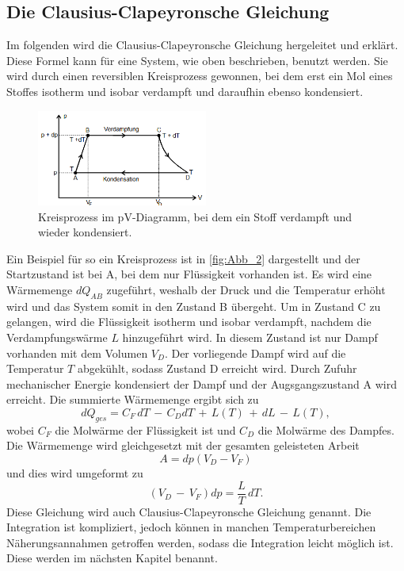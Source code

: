 \subsection{Die Clausius-Clapeyronsche Gleichung} %
\label{sub:CC-Gl}
Im folgenden wird die Clausius-Clapeyronsche Gleichung hergeleitet und erklärt. 
Diese Formel kann für eine System, wie oben beschrieben, benutzt werden.
Sie wird durch einen reversiblen Kreisprozess gewonnen, bei dem erst ein Mol eines Stoffes isotherm und isobar verdampft und daraufhin ebenso kondensiert.
\begin{figure}[H]
    \centering
    \includegraphics[width=0.5\textwidth]{build/Abb_2.PNG}
    \caption {Kreisprozess im pV-Diagramm, bei dem ein Stoff verdampft und wieder kondensiert.\cite{v203}}
    \label{fig:Abb_2}
\end{figure}
Ein Beispiel für so ein Kreisprozess ist in \autoref{fig:Abb_2} dargestellt und der Startzustand ist bei A, bei dem nur Flüssigkeit vorhanden ist.
Es wird eine Wärmemenge $dQ_{AB}$ zugeführt, weshalb der Druck und die Temperatur erhöht wird und das System somit in den Zustand B übergeht.
Um in Zustand C zu gelangen, wird die Flüssigkeit isotherm und isobar verdampft, nachdem die Verdampfungswärme $L$ hinzugeführt wird.
In diesem Zustand ist nur Dampf vorhanden mit dem Volumen $V_D$.
Der vorliegende Dampf wird auf die Temperatur $T$ abgekühlt, sodass Zustand D erreicht wird.
Durch Zufuhr mechanischer Energie kondensiert der Dampf und der Augsgangszustand A wird erreicht.
Die summierte Wärmemenge ergibt sich zu
\begin{equation}
    dQ_{ges} = C_F\, dT \,-\, C_D dT \,+\, L(T) \,+\, dL \,-\, L(T),
    \label{eqn:Wärmemenge}
\end{equation}
wobei $C_F$ die Molwärme der Flüssigkeit ist und $C_D$ die Molwärme des Dampfes.
Die Wärmemenge wird gleichgesetzt mit der gesamten geleisteten Arbeit
\begin{equation}
    A = dp(V_D-V_F)
    \label{eqn:Arbeit}
\end{equation}
und dies wird umgeformt zu
\begin{equation}
    (V_D\,-\,V_F)dp = \frac{L}{T}\,dT .
    \label{eqn:CC-Gl}
\end{equation}
Diese Gleichung wird auch Clausius-Clapeyronsche Gleichung genannt. 
Die Integration ist kompliziert, jedoch können in manchen Temperaturbereichen Näherungsannahmen getroffen werden, sodass die Integration leicht möglich ist.
Diese werden im nächsten Kapitel benannt.

